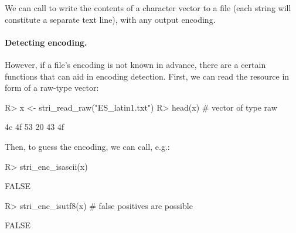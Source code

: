 \documentclass[nojss]{jss}
\begin{document}
We can call  to write the contents
of a character vector to a file (each string will
constitute a separate text line), with any output encoding.




\paragraph{Detecting encoding.}
However, if a file's encoding is not known in advance, there are
a certain functions that can aid in encoding detection.
First, we can read the resource in form of a raw-type vector:

%

\begin{Schunk}
\begin{Sinput}
R> x <- stri_read_raw("ES_latin1.txt")
R> head(x)  # vector of type raw
\end{Sinput}
\begin{Soutput}
[1] 4c 4f 53 20 43 4f
\end{Soutput}
\end{Schunk}

Then, to guess the encoding, we can call, e.g.:

\begin{Schunk}
\begin{Sinput}
R> stri_enc_isascii(x)
\end{Sinput}
\begin{Soutput}
[1] FALSE
\end{Soutput}
\begin{Sinput}
R> stri_enc_isutf8(x)   # false positives are possible
\end{Sinput}
\begin{Soutput}
[1] FALSE
\end{Soutput}
\end{Schunk}
\end{document}
